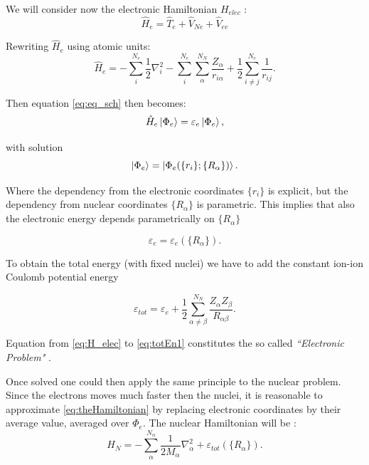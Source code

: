\documentclass[a4paper,12pt]{article}
\begin{document}
We will consider now the electronic Hamiltonian $H_{elec}$ :
\begin{equation}
	\hat{H}_{e} = \hat{T}_{e} + \hat{V}_{Ne} + \hat{V}_{ee}
\end{equation}

Rewriting $\hat{H}_{e}$  using atomic units:
\begin{equation}\label{eq:H_elec}
	\hat{H}_{e} = 	- \sum_{i}^{N_{e}} \frac{1}{2} \nabla_{i}^2  
					- \sum_{i}^{N_{e}} \sum_{\alpha}^{N_{N}} \frac{Z_{\alpha}}{r_{i\alpha}}  
					+ \frac{1}{2} \sum_{i \neq j}^{N_{e}} \frac{1}{r_{ij}}.
\end{equation}

Then equation \eqref{eq:eq_sch} then becomes:
\begin{equation}
	\hat{H}_{e} \ket{\Phi_{e}} = \varepsilon_{e} \ket{\Phi_{e}},
\end{equation}

with solution
\begin{equation}
	\ket{\Phi_{e}} = \ket{\Phi_{e}( \{r_{i}\};\{R_{\alpha}\} )}.
\end{equation}

Where the dependency from the electronic coordinates $\{r_i\}$ is explicit, but the dependency from nuclear coordinates $\{R_{\alpha}\}$ is parametric.
This implies that also the electronic energy depends parametrically on $\{R_{\alpha}\}$

\begin{equation}
	\varepsilon_{e} = \varepsilon_{e}(\{R_{\alpha}\}).
\end{equation}

To obtain the total energy (with fixed nuclei) we have to add the constant ion-ion Coulomb potential energy

\begin{equation}\label{eq:totEn1}
	\varepsilon_{tot} = \varepsilon_{e} + \frac{1}{2} \sum_{\alpha \neq \beta}^{N_N} \frac{Z_{\alpha} Z_{\beta} }{R_{\alpha \beta}}.
\end{equation}

Equation from \eqref{eq:H_elec} to \eqref{eq:totEn1} constitutes the so called \textit{``Electronic Problem"} \cite[p.44]{Attila}.

Once solved one could then apply the same principle to the nuclear problem.
Since the electrons moves much faster then the nuclei, it is reasonable to approximate \eqref{eq:theHamiltonian} by replacing electronic coordinates by their average value, averaged over $\Phi_{e}$.
The nuclear Hamiltonian will be :
\begin{equation}
	H_{N} = - \sum_{\alpha}^{N_{\alpha}} \frac{1}{2M_{\alpha}} \nabla_{\alpha}^2 + \varepsilon_{tot}(\{ R_{\alpha}\}).
\end{equation}
\end{document}
